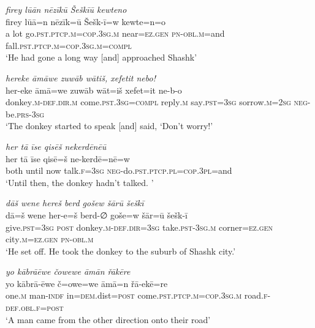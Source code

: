 \ea \label{HB.30}
\textit{firey lūān nēzīkū Šeškīū kewteno} \\ 
\gll firey lūā=n nēzīk=ū Šešk-ī=w kewte=n=o \\ 
 a lot go\textsc{.pst}\textsc{.ptcp}\textsc{.m}\textsc{=cop}\textsc{.3sg}\textsc{.m} near\textsc{=ez}\textsc{.gen} \textsc{pn}\textsc{-obl}\textsc{.m}=and fall\textsc{.pst}\textsc{.ptcp}\textsc{.m}\textsc{=cop}\textsc{.3sg}\textsc{.m}\textsc{=\textsc{compl}} \\ 
\glt `He had gone a long way [and] approached Shashk'
\z 
 
\ea \label{HB.31}
\textit{hereke āmāwe zuwāb wātiš, xefetit nebo!} \\ 
\gll her-eke āmā=we zuwāb wāt=iš xefet=it ne-b-o \\ 
 donkey\textsc{.m}\textsc{-def}\textsc{.dir}\textsc{.m} come\textsc{.pst}\textsc{.3sg}\textsc{=compl} reply\textsc{.m} say\textsc{.pst}\textsc{=3sg} sorrow\textsc{.m}\textsc{=\textsc{2sg}} \textsc{neg-}be\textsc{.prs}\textsc{-3sg} \\ 
\glt `The donkey started to speak [and] said, ‘Don’t worry!'
\z 
 
\ea \label{HB.46}
\textit{her tā īse qisēš nekerdēnēū} \\ 
\gll her tā īse qisē=š ne-kerdē=nē=w \\ 
 both until now talk\textsc{\textsc{.f}}\textsc{=3sg} \textsc{neg-}do\textsc{.pst}\textsc{.ptcp}\textsc{.pl}\textsc{=cop}\textsc{.3pl}=and \\ 
\glt `Until then, the donkey hadn’t talked. '
\z 
 
\ea \label{HB.48}
\textit{dāš wene hereš berd gošew šārū šeškī} \\ 
\gll dā=š wene her-e=š berd-∅ goše=w šār=ū šešk-ī \\ 
 give\textsc{.pst}\textsc{=3sg} \textsc{post} donkey\textsc{.m}\textsc{-def}\textsc{.dir}\textsc{=3sg} take\textsc{.pst}\textsc{-3sg}\textsc{.m} corner\textsc{=ez}\textsc{.gen} city\textsc{.m}\textsc{=ez}\textsc{.gen} \textsc{pn}\textsc{-obl}\textsc{.m} \\ 
\glt `He set off. He took the donkey to the suburb of Shashk city.'
\z 
 
\ea \label{HB.49}
\textit{yo kābrāēwe čowewe āmān řākēre} \\ 
\gll yo kābrā-ēwe č=owe=we āmā=n řā-ekē=re \\ 
 one\textsc{.m} man\textsc{-indf} in\textsc{=dem}.dist\textsc{=\textsc{post}} come\textsc{.pst}\textsc{.ptcp}\textsc{.m}\textsc{=cop}\textsc{.3sg}\textsc{.m} road\textsc{\textsc{.f}}\textsc{-def}\textsc{.obl}\textsc{\textsc{.f}}\textsc{=\textsc{post}} \\ 
\glt `A man came from the other direction onto their road'
\z 
 

